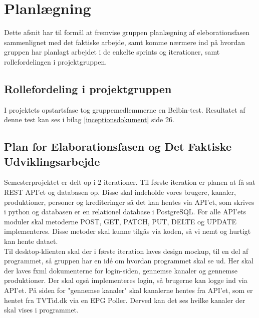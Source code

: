 \section{Planlægning}
Dette afsnit har til formål at fremvise gruppen planlægning af eleborationsfasen sammenlignet med det faktiske arbejde, samt komme nærmere ind på hvordan gruppen har planlagt arbejdet i de enkelte sprints og iterationer, samt rollefordelingen i projektgruppen.

\subsection{Rollefordeling i projektgruppen}
I projektets opstartsfase tog gruppemedlemmerne en Belbin-test. Resultatet af denne test kan ses i bilag \ref{inceptionsdokument} side 26. 

\subsection{Plan for Elaborationsfasen og Det Faktiske Udviklingsarbejde}

Semesterprojektet er delt op i 2 iterationer. Til første iteration er planen at få sat REST API'et og databasen op. Disse skal indeholde vores brugere, kanaler, produktioner, personer og krediteringer så det kan hentes via API'et, som skrives i python og databasen er en relationel database i PostgreSQL. For alle API'ets moduler skal metoderne POST, GET, PATCH, PUT, DELTE og UPDATE implementeres. Disse metoder skal kunne tilgås via koden, så vi nemt og hurtigt kan hente dataet.\\

Til desktop-klienten skal der i første iteration laves design mockup, til en del af programmet, så gruppen har en idé om hvordan programmet skal se ud. Her skal der laves fxml dokumenterne for login-siden, gennemse kanaler og gennemse produktioner. Der skal også implementeres login, så brugerne kan logge ind via API'et. På siden for "gennemse kanaler" skal kanalerne hentes fra API'et, som er hentet fra TVTid.dk via en EPG Poller. Derved kan det ses hvilke kanaler der skal vises i programmet. \\

